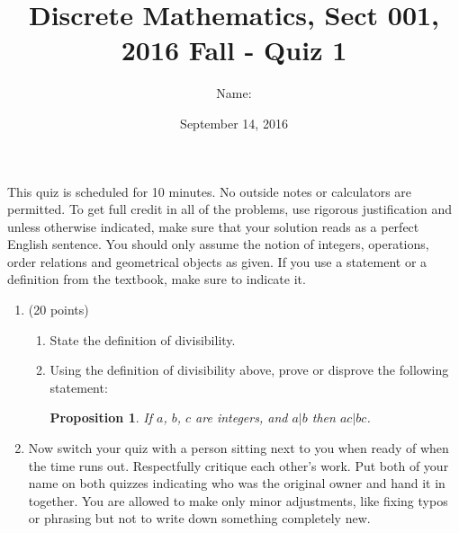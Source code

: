 \documentclass[11pt]{preprint}
\title{Discrete Mathematics, Sect 001, 2016 Fall - Quiz 1}
\author{Name:}
\institute{Courant Institute of Mathematical Sciences, NYU}
\date{September 14, 2016}
\newtheorem*{proposition}{Proposition}
\begin{document}
\maketitle

This quiz is scheduled for 10 minutes. No outside notes or calculators are permitted. To get full credit  in all of the problems, use rigorous justification and unless otherwise indicated, make sure that your solution reads as a perfect English sentence. You should only assume the notion of integers, operations, order relations and geometrical objects as given. If you use a statement or a definition from the textbook, make sure to indicate it.
\vspace{0.2cm}

\begin{enumerate}
\item (20 points)
\begin{enumerate}
\item State the definition of divisibility.
\vspace{3cm}
\item Using the definition of divisibility above, prove or disprove the following statement:
\begin{proposition}
If $a$, $b$, $c$ are integers, and $a|b$ then $ac|bc$.
\end{proposition}
\end{enumerate}

\vspace{3cm}

\item Now switch your quiz with a person sitting next to you when ready of when the time runs out. Respectfully critique each other's work. Put both of your name on both quizzes indicating who was the original owner and hand it in together. You are allowed to make only minor adjustments, like fixing typos or phrasing but not to write down something completely new.
\end{enumerate}
\end{document}
